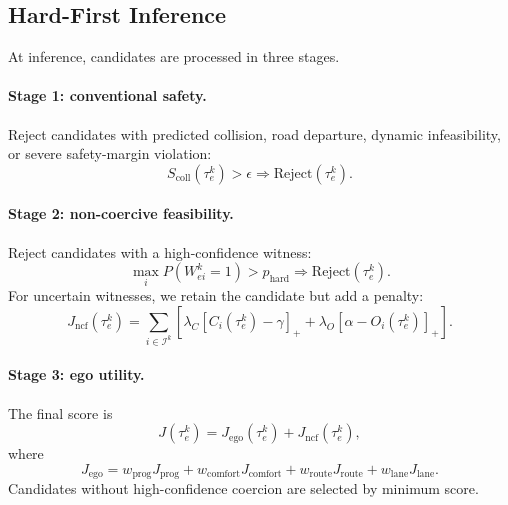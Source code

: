 \documentclass[10pt]{article}
\begin{document}
\subsection{Hard-First Inference}
\label{app:hard_first}

At inference, candidates are processed in three stages.

\paragraph{Stage 1: conventional safety.}
Reject candidates with predicted collision, road departure, dynamic infeasibility, or severe safety-margin violation:
\begin{equation}
    S_{\mathrm{coll}}(\tau^k_e)>\epsilon
    \Rightarrow
    \mathrm{Reject}(\tau^k_e).
\end{equation}

\paragraph{Stage 2: non-coercive feasibility.}
Reject candidates with a high-confidence witness:
\begin{equation}
    \max_i
    P(W^k_{ei}=1)
    >
    p_{\mathrm{hard}}
    \Rightarrow
    \mathrm{Reject}(\tau^k_e).
\end{equation}
For uncertain witnesses, we retain the candidate but add a penalty:
\begin{equation}
    J_{\mathrm{ncf}}(\tau^k_e)
    =
    \sum_{i\in\mathcal{I}^k}
    \left[
    \lambda_C [C_i(\tau^k_e)-\gamma]_+
    +
    \lambda_O [\alpha-O_i(\tau^k_e)]_+
    \right].
\end{equation}

\paragraph{Stage 3: ego utility.}
The final score is
\begin{equation}
    J(\tau^k_e)
    =
    J_{\mathrm{ego}}(\tau^k_e)
    +
    J_{\mathrm{ncf}}(\tau^k_e),
\end{equation}
where
\begin{equation}
    J_{\mathrm{ego}}
    =
    w_{\mathrm{prog}}J_{\mathrm{prog}}
    +
    w_{\mathrm{comfort}}J_{\mathrm{comfort}}
    +
    w_{\mathrm{route}}J_{\mathrm{route}}
    +
    w_{\mathrm{lane}}J_{\mathrm{lane}} .
\end{equation}
Candidates without high-confidence coercion are selected by minimum score.
\end{document}
